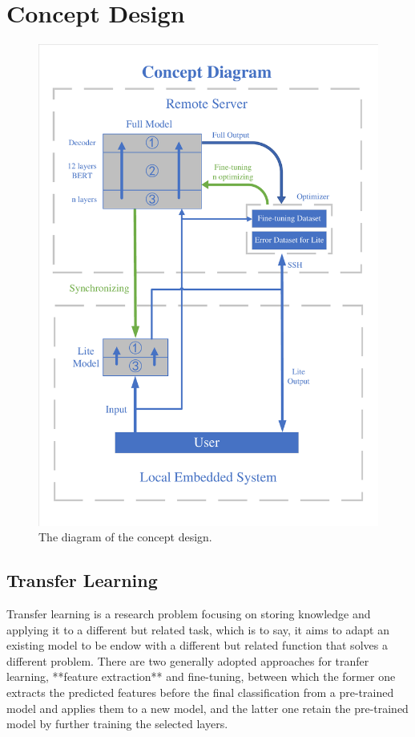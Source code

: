 \documentclass[a4paper]{article}
\begin{document}
\section{Concept Design}
\begin{figure}[H]
    \centering
    \includegraphics[width=1\textwidth]{Concept_Design.pdf}
    \caption{The diagram of the concept design.}
\end{figure}

\subsection{Transfer Learning}
Transfer learning is a research problem focusing on storing knowledge and applying it to a different but related task, which is to say, it aims to adapt an existing model to be endow with a different but related function that solves a different problem. There are two generally adopted approaches for tranfer learning, **feature extraction** and fine-tuning, between which the former one extracts the predicted features before the final classification from a pre-trained model and applies them to a new model, and the latter one retain the pre-trained model by further training the selected layers. 
\end{document}
